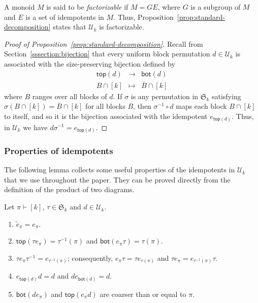 \documentclass[ALCO,Unicode]{cedram}
\newcommand{\defncolor}{\color{darkred}}
\newcommand{\defn}[1]{{\defncolor\emph{#1}}} %
\begin{document}
\begin{remark}
    A monoid $M$ is said to be \defn{factorizable} if $M = G E$, where $G$ is
    a subgroup of $M$ and $E$ is a set of idempotents in $M$.
    Thus, Proposition~\ref{prop:standard-decomposition} states that
    $\mathcal{U}_k$ is factorizable.
\end{remark}

\begin{proof}[Proof of Proposition~\ref{prop:standard-decomposition}]
    Recall from Section~\ref{sssection:bijection} that every uniform block
    permutation $d \in \mathcal{U}_k$ is associated with the size-preserving
    bijection defined by
    \begin{eqnarray*}
        \mathsf{top}(d) & \longrightarrow & \mathsf{bot}(d)\\
        B \cap [k] & \longmapsto & \overline{B} \cap [k]
    \end{eqnarray*}
    where $B$ ranges over all blocks of $d$.
    If $\sigma$ is any permutation in $\mathfrak{S}_k$ satisfying
    $\sigma(B \cap [k]) = \overline{B} \cap [k]$ for all blocks $B$,
    then $\sigma^{-1} \circ d$ maps each block $B \cap [k]$ to itself,
    and so it is the bijection associated with the idempotent $e_{\mathsf{top}(d)}$.
    Thus, in $\mathcal{U}_k$ we have $d \sigma^{-1} = e_{\mathsf{top}(d)}$.
\end{proof}

\subsubsection{Properties of idempotents}

The following lemma collects some useful properties of the idempotents in
$\mathcal{U}_k$ that we use throughout the paper.
They can be proved directly from the definition of the product of two diagrams.

\begin{lemma}\label{lem:eproperties}
Let $\pi\vdash [k]$, $\tau\in \mathfrak{S}_k$ and $d \in \mathcal{U}_k$.
\begin{enumerate}[label=(\alph*)]
\item $\widetilde{e}_\pi = e_\pi$.
\item $\mathsf{top}(\tau e_\pi) = \tau^{-1}(\pi)$ and $\mathsf{bot}(e_\pi\tau) = \tau(\pi)$.
\item $\tau e_\pi \tau^{-1} = e_{\tau^{-1}(\pi)}$; consequently, $e_\pi \tau = \tau e_{\tau(\pi)}$ and $\tau e_\pi  =  e_{\tau^{-1}(\pi)}\tau$.
\item $e_{\mathsf{top}(d)} d = d$ and $de_{\mathsf{bot}(d)} = d$.
\item $\mathsf{bot}(d e_\pi)$ and $\mathsf{top}(e_\pi d)$ are coarser than or equal to $\pi$.
\end{enumerate}
\end{lemma}
\end{document}
